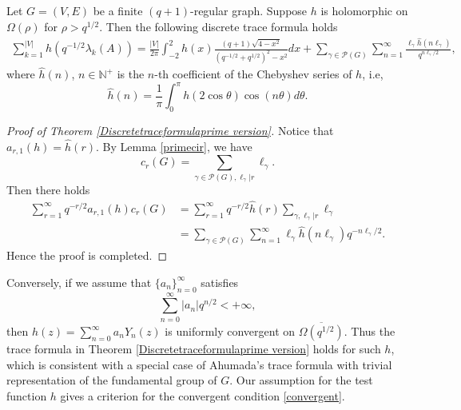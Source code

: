 \documentclass{article}
\begin{document}
\begin{theorem}\label{Discretetraceformulaprime version}
    Let $G=(V,E)$ be a finite $(q+1)$-regular graph. Suppose $h$ is holomorphic on $\Omega(\rho)$ for $\rho>q^{1/2}$. Then
    the following discrete trace formula holds
    \begin{equation*}
    \begin{aligned}
\sum_{k=1}^{|V|} h(q^{-1/2}\lambda_k(A))=
\frac{|V|}{2\pi}\int_{-2}^{2} h(x) \frac{(q+1)\sqrt{4-x^2}}{ (q^{-1/2}+q^{1/2})^2-x^2}dx+\sum_{\gamma \in \mathcal{P}(G)} \sum_{n=1}^{\infty}\frac{\ell_\gamma \hat{h}(n\ell_\gamma)}{q^{n\ell_\gamma/2}}
,
\end{aligned}
\end{equation*}
where $\hat{h}(n)$, $n\in \mathbb{N}^+$ is the $n$-th coefficient of the Chebyshev series of $h$, i.e, 
\begin{equation*}
    \hat{h}(n)=\frac{1}{\pi}\int_{0}^{\pi}h(2\cos\theta)\cos(n\theta)d\theta.
\end{equation*}
\end{theorem}
\begin{proof}[Proof of Theorem \ref{Discretetraceformulaprime version}]
    Notice that $a_{r,1}(h)=\hat{h}(r)$. By Lemma \ref{primecir}, we have \[c_r(G)=\sum\limits_{\gamma\in \mathcal{P}(G),\ell_\gamma|r}\ell_\gamma.\] Then there holds
    $$\begin{aligned}
        \sum_{r=1}^{\infty}q^{-r/2}a_{r,1}(h)c_r(G)&=\sum_{r=1}^{\infty}q^{-r/2} \hat{h}(r) \sum_{\gamma,\ell_\gamma|r}\ell_\gamma\\
       &=\sum_{\gamma \in \mathcal{P}(G)}\sum_{n=1}^{\infty}\ell_\gamma \hat{h}(n\ell_\gamma) q^{-n\ell_\gamma/2}.
    \end{aligned}$$
    Hence the proof is completed.
\end{proof}
Conversely, if we assume that $\{a_{n}\}_{n=0}^{\infty}$ satisfies 
\begin{equation}\label{convergent}
    \sum_{n=0}^{\infty}|a_{n}|q^{n/2}<+\infty,
\end{equation}
then $h(z)=\sum_{n=0}^{\infty}a_{n}Y_{n}(z)$ is uniformly convergent on $\overline{\Omega(q^{1/2})}$. Thus the trace formula in Theorem \ref{Discretetraceformulaprime version} holds for such $h$, which is consistent with a special case of Ahumada's trace formula \cite{Ahu87} with trivial representation of the fundamental group of $G$. Our assumption for the test function $h$ gives a criterion for the convergent condition \eqref{convergent}.
\end{document}

